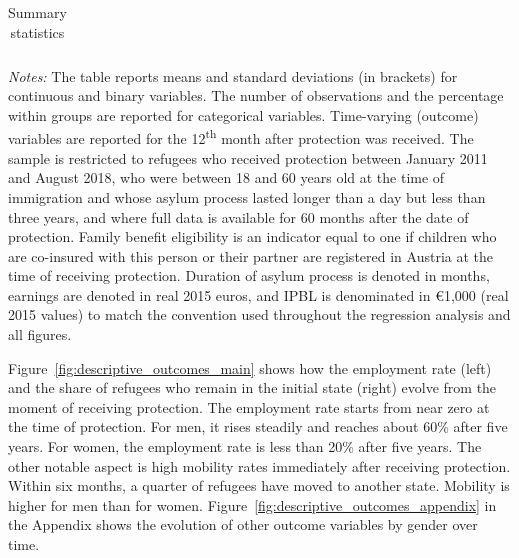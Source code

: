 \begin{table}
    \caption{Summary statistics}
    \label{tab:summarystatistics}
    \begin{threeparttable}
        \begin{small}
                \begin{tabular}{lcccc}
                    
                \end{tabular}
        \end{small}
        \begin{tablenotes}
           \footnotesize
                \item {\textit{Notes:} The table reports means and standard deviations (in brackets) for continuous and binary variables. The number of observations and the percentage within groups are reported for categorical variables. Time-varying (outcome) variables are reported for the 12\textsuperscript{th} month after protection was received. The sample is restricted to refugees who received protection between January 2011 and August 2018, who were between 18 and 60 years old at the time of immigration and whose asylum process lasted longer than a day but less than three years, and where full data is available for 60 months after the date of protection. Family benefit eligibility is an indicator equal to one if children who are co-insured with this person or their partner are registered in Austria at the time of receiving protection. Duration of asylum process is denoted in months, earnings are denoted in real 2015 euros, and IPBL is denominated in €1,000 (real 2015 values) to match the convention used throughout the regression analysis and all figures.}
        \end{tablenotes}
    \end{threeparttable}
\end{table}

Figure~\ref{fig:descriptive_outcomes_main} shows how the employment rate (left) and the share of refugees who remain in the initial state (right) evolve from the moment of receiving protection. The employment rate starts from near zero at the time of protection. For men, it rises steadily and reaches about 60\% after five years. For women, the employment rate is less than 20\% after five years. The other notable aspect is high mobility rates immediately after receiving protection. Within six months, a quarter of refugees have moved to another state. Mobility is higher for men than for women. Figure~\ref{fig:descriptive_outcomes_appendix} in the Appendix shows the evolution of other outcome variables by gender over time.



